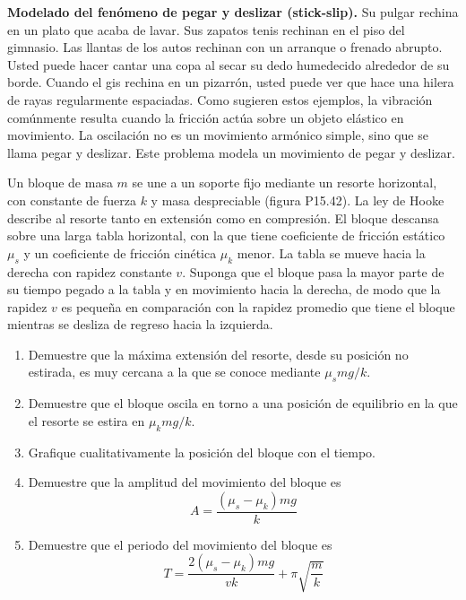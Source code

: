 \item \textbf{Modelado del fenómeno de pegar y deslizar (stick-slip).}
Su pulgar rechina en un plato que acaba de lavar. Sus zapatos tenis rechinan en el piso del gimnasio. Las llantas de los autos rechinan con un arranque o frenado abrupto. Usted puede hacer cantar una copa al secar su dedo humedecido alrededor de su borde. Cuando el gis rechina en un pizarrón, usted puede ver que hace una hilera de rayas regularmente espaciadas. Como sugieren estos ejemplos, la vibración comúnmente resulta cuando la fricción actúa sobre un objeto elástico en movimiento. La oscilación no es un movimiento armónico simple, sino que se llama pegar y deslizar. Este problema modela un movimiento de pegar y deslizar.

Un bloque de masa $m$ se une a un soporte fijo mediante un resorte horizontal, con constante de fuerza $k$ y masa despreciable (figura P15.42). La ley de Hooke describe al resorte tanto en extensión como en compresión. El bloque descansa sobre una larga tabla horizontal, con la que tiene coeficiente de fricción estático $\mu_s$ y un coeficiente de fricción cinética $\mu_k$ menor. La tabla se mueve hacia la derecha con rapidez constante $v$. Suponga que el bloque pasa la mayor parte de su tiempo pegado a la tabla y en movimiento hacia la derecha, de modo que la rapidez $v$ es pequeña en comparación con la rapidez promedio que tiene el bloque mientras se desliza de regreso hacia la izquierda.
\begin{enumerate}
    \item Demuestre que la máxima extensión del resorte, desde su posición no estirada, es muy cercana a la que se conoce mediante $\mu_s mg/k$.
    \item Demuestre que el bloque oscila en torno a una posición de equilibrio en la que el resorte se estira en $\mu_k mg/k$.
    \item Grafique cualitativamente la posición del bloque con el tiempo.
    \item Demuestre que la amplitud del movimiento del bloque es
    $$ A = \frac{(\mu_s - \mu_k)mg}{k} $$
    \item Demuestre que el periodo del movimiento del bloque es
    $$ T = \frac{2(\mu_s - \mu_k)mg}{vk} + \pi \sqrt{\frac{m}{k}} $$
\end{enumerate}